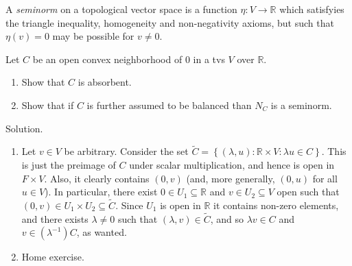 \documentclass[12pt, reqno,a4paper, twoside]{amsproc}
\newcommand{\dbR}{\mathbb R}
\newcommand{\set}[1]{\left\{{#1}\right\}}
\renewcommand{\tilde}{\widetilde}
\newenvironment{sol}{\sc Solution. \rm}{\hfill \qedsymbol\bigskip}
\begin{document}
\begin{defi}[Seminorm]
	A \textit{seminorm} on a topological vector space is a function $\eta:V\to \dbR$ which satisfyies the triangle inequality, homogeneity and non-negativity axioms, but such that $\eta(v)=0$ may be possible for $v\ne 0$.
\end{defi}
\begin{exer}
	Let $C$ be an open convex neighborhood of $0$ in a tvs $V$ over $\dbR$. 
	\begin{enumerate}
		\item Show that $C$ is absorbent. 
		\item Show that if $C$ is further assumed to be balanced than $N_C$ is a seminorm.
	\end{enumerate}
\end{exer}
\begin{sol}
	\begin{enumerate}
		\item Let $v\in V$ be arbitrary. Consider the set $\tilde{C}=\set{(\lambda,u):\dbR\times V:\lambda u\in C}$. This is just the preimage of $C$ under scalar multiplication, and hence is open in $F\times V$. Also, it clearly contains $(0,v)$ (and, more generally, $(0,u)$ for all $u\in V$). In particular, there exist $0\in U_1\subseteq \dbR$ and $v\in U_2\subseteq V$ open such that $(0,v)\in U_1\times U_2\subseteq \tilde{C}$. Since $U_1$ is open in $\dbR$ it contains non-zero elements, and there exists $\lambda\ne 0$ such that $(\lambda,v)\in \tilde{C}$, and so $\lambda v\in C$ and $v\in (\lambda^{-1})C$, as wanted.
		
		\item Home exercise.%
	\end{enumerate}
\end{sol}
%
\end{document}
